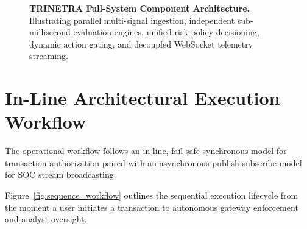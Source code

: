 \documentclass[11pt,a4paper]{article}
\begin{document}
\begin{figure}[!ht]
\caption{\textbf{TRINETRA Full-System Component Architecture.} Illustrating parallel multi-signal ingestion, independent sub-millisecond evaluation engines, unified risk policy decisioning, dynamic action gating, and decoupled WebSocket telemetry streaming.}
\label{fig:system_architecture}
\end{figure}

\section{In-Line Architectural Execution Workflow}
\label{sec:workflow}

The operational workflow follows an in-line, fail-safe synchronous model for transaction authorization paired with an asynchronous publish-subscribe model for SOC stream broadcasting.

Figure~\ref{fig:sequence_workflow} outlines the sequential execution lifecycle from the moment a user initiates a transaction to autonomous gateway enforcement and analyst oversight.
\end{document}
